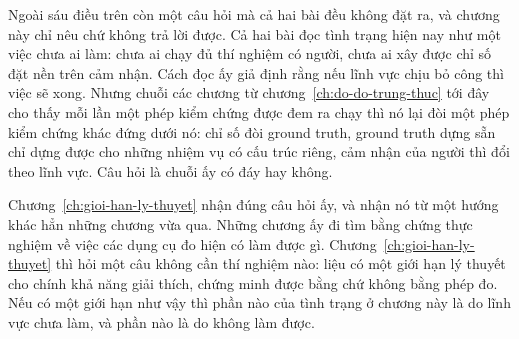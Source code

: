 Ngoài sáu điều trên còn một câu hỏi mà cả hai bài đều không đặt ra, và chương
này chỉ nêu chứ không trả lời được. Cả hai bài đọc tình trạng hiện nay như một
việc chưa ai làm: chưa ai chạy đủ thí nghiệm có người, chưa ai xây được chỉ số
đặt nền trên cảm nhận. Cách đọc ấy giả định rằng nếu lĩnh vực chịu bỏ công thì
việc sẽ xong. Nhưng chuỗi các chương từ
chương~\ref{ch:do-do-trung-thuc} tới đây cho thấy mỗi lần một phép kiểm chứng
được đem ra chạy thì nó lại đòi một phép kiểm chứng khác đứng dưới nó: chỉ số
đòi ground truth, ground truth dựng sẵn chỉ dựng được cho những nhiệm vụ có
cấu trúc riêng, cảm nhận của người thì đổi theo lĩnh vực. Câu hỏi là chuỗi ấy
có đáy hay không.

Chương~\ref{ch:gioi-han-ly-thuyet} nhận đúng câu hỏi ấy, và nhận nó từ một
hướng khác hẳn những chương vừa qua. Những chương ấy đi tìm bằng chứng thực
nghiệm về việc các dụng cụ đo hiện có làm được gì. Chương~\ref{ch:gioi-han-ly-thuyet}
thì hỏi một câu không cần thí nghiệm nào: liệu có một giới hạn lý thuyết cho chính khả năng giải
thích, chứng minh được bằng  chứ không bằng phép đo. Nếu có một giới hạn như vậy thì phần nào của tình
trạng ở chương này là do lĩnh vực chưa làm, và phần nào là do không làm được.

%
